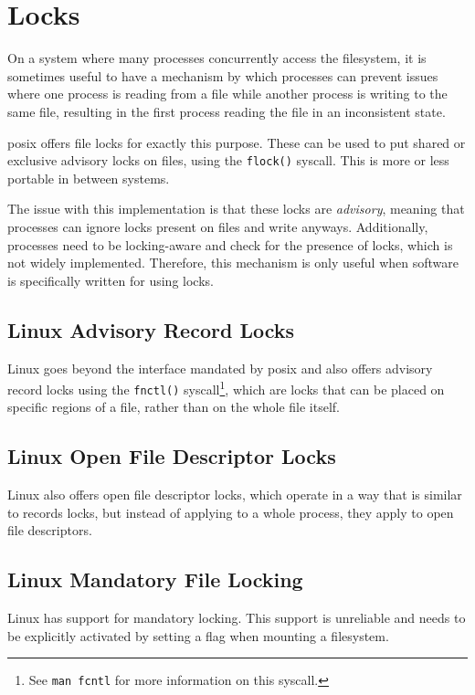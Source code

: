 \documentclass[a4paper]{article}
\begin{document}
\section{Locks}

On a system where many processes concurrently access the filesystem, it is sometimes useful to have a mechanism by which processes can prevent issues where one process is reading from a file while another process is writing to the same file, resulting in the first process reading the file in an inconsistent state.

\gls{posix} offers file locks for exactly this purpose. These can be used to put shared or exclusive advisory locks on files, using the \verb|flock()| syscall. This is more or less portable in between systems.

The issue with this implementation is that these locks are \emph{advisory}, meaning that processes can ignore locks present on files and write anyways. Additionally, processes need to be locking-aware and check for the presence of locks, which is not widely implemented. Therefore, this mechanism is only useful when software is specifically written for using locks.

\subsection{Linux Advisory Record Locks}

Linux goes beyond the interface mandated by \gls{posix} and also offers advisory record locks using the \verb|fnctl()| syscall\footnote{See \texttt{man fcntl} for more information on this syscall.}, which are locks that can be placed on specific regions of a file, rather than on the whole file itself.

\subsection{Linux Open File Descriptor Locks}

Linux also offers open file descriptor locks, which operate in a way that is similar to records locks, but instead of applying to a whole process, they apply to open file descriptors.

\subsection{Linux Mandatory File Locking}

Linux has support for mandatory locking. This support is unreliable and needs to be explicitly activated by setting a flag when mounting a filesystem. 
\end{document}
